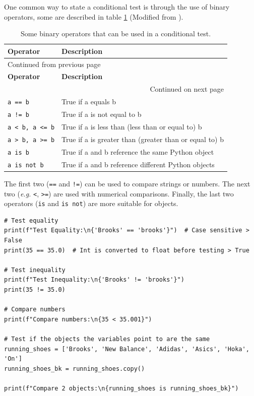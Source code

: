 \documentclass[10pt]{book}
\begin{document}
One common way to state a conditional test is through the use of binary  operators, some are described in table \ref{tab:org98aea2a} (Modified from \textcite{McKinney-2022}).

{\footnotesize
\begin{longtable}{lp{}}
\caption{\label{tab:org98aea2a}Some binary operators that can be used in a conditional test.}
\\
\toprule
\textbf{Operator} & \textbf{Description}\\
\midrule
\endfirsthead
\multicolumn{2}{l}{Continued from previous page} \\
\toprule

\textbf{Operator} & \textbf{Description} \\

\midrule
\endhead
\midrule\multicolumn{2}{r}{Continued on next page} \\
\endfoot
\endlastfoot
\texttt{a == b} & True if a equals b\\
\texttt{a != b} & True if a is not equal to b\\
\texttt{a < b, a <= b} & True if a is less than (less than or equal to) b\\
\texttt{a > b, a >= b} & True if a is greater than (greater than or equal to) b\\
\texttt{a is b} & True if a and b reference the same Python object\\
\texttt{a is not b} & True if a and b reference different Python objects\\
\bottomrule
\end{longtable}}

The first two (\texttt{==} and \texttt{!=}) can be used to compare strings or numbers. The next two (\emph{e.g.} \texttt{<}, \texttt{>=}) are used with numerical comparisons. Finally, the last two operators (\texttt{is} and \texttt{is not}) are more suitable for objects.

\label{org001394e}
\begin{verbatim}
# Test equality
print(f"Test Equality:\n{'Brooks' == 'brooks'}")  # Case sensitive > False
print(35 == 35.0)  # Int is converted to float before testing > True

# Test inequality
print(f"Test Inequality:\n{'Brooks' != 'brooks'}")
print(35 != 35.0)

# Compare numbers
print(f"Compare numbers:\n{35 < 35.001}")

# Test if the objects the variables point to are the same
running_shoes = ['Brooks', 'New Balance', 'Adidas', 'Asics', 'Hoka', 'On']
running_shoes_bk = running_shoes.copy()

print(f"Compare 2 objects:\n{running_shoes is running_shoes_bk}")
\end{verbatim}
\end{document}
